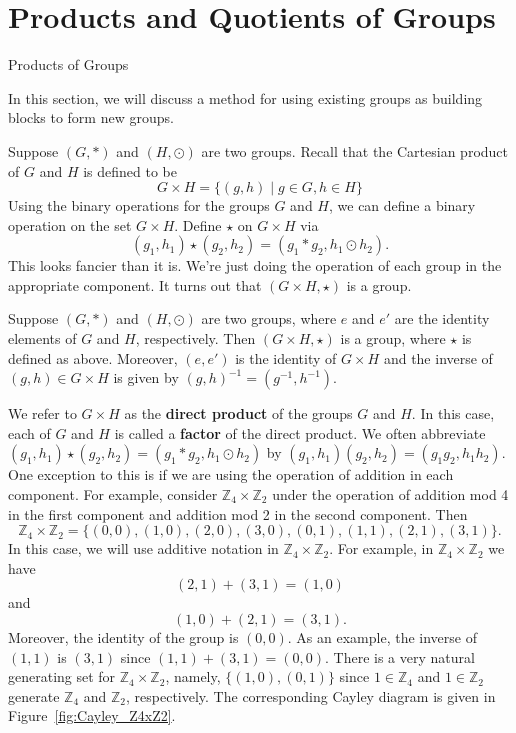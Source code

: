 \chapter{Products and Quotients of Groups}
\label{chapter:products_quotients}

\begin{section}{Products of Groups}

In this section, we will discuss a method for using existing groups as building blocks to form new groups.

Suppose $(G,*)$ and $(H,\odot)$ are two groups.  Recall that the Cartesian product of $G$ and $H$ is defined to be
\[
G\times H=\{(g,h)\mid g\in G,h\in H\}
\]
Using the binary operations for the groups $G$ and $H$, we can define a binary operation on the set $G\times H$.  Define $\star$ on $G\times H$ via
\[
(g_1,h_1)\star(g_2,h_2)=(g_1*g_2,h_1\odot h_2).
\]
This looks fancier than it is.  We're just doing the operation of each group in the appropriate component.  It turns out that $(G\times H,\star)$ is a group.

\begin{theorem}
Suppose $(G,*)$ and $(H,\odot)$ are two groups, where $e$ and $e'$ are the identity elements of $G$ and $H$, respectively.   Then $(G\times H,\star)$ is a group, where $\star$ is defined as above.  Moreover, $(e,e')$ is the identity of $G\times H$ and the inverse of $(g,h)\in G\times H$ is given by $(g,h)^{-1}=(g^{-1},h^{-1})$.
\end{theorem}

We refer to $G\times H$ as the \textbf{direct product} of the groups $G$ and $H$.  In this case, each of $G$ and $H$ is called a \textbf{factor} of the direct product.  We often abbreviate $(g_1,h_1)\star(g_2,h_2)=(g_1*g_2,h_1\odot h_2)$ by $(g_1,h_1)(g_2,h_2)=(g_1 g_2,h_1 h_2)$. One exception to this is if we are using the operation of addition in each component.  For example, consider $\mathbb{Z}_4\times \mathbb{Z}_2$ under the operation of addition mod 4 in the first component and addition mod 2 in the second component.  Then
\[
\mathbb{Z}_4 \times \mathbb{Z}_2=\{(0,0),(1,0),(2,0),(3,0),(0,1),(1,1),(2,1),(3,1)\}.
\]
In this case, we will use additive notation in $\mathbb{Z}_4\times \mathbb{Z}_2$.  For example, in $\mathbb{Z}_4 \times \mathbb{Z}_2$ we have
\[
(2,1)+(3,1)=(1,0)
\]
and
\[
(1,0)+(2,1)=(3,1).
\]
Moreover, the identity of the group is $(0,0)$.  As an example, the inverse of $(1,1)$ is $(3,1)$ since $(1,1)+(3,1)=(0,0)$.  There is a very natural generating set for $\mathbb{Z}_4\times \mathbb{Z}_2$, namely, $\{(1,0),(0,1)\}$ since $1\in \mathbb{Z}_4$ and $1\in \mathbb{Z}_2$ generate $\mathbb{Z}_4$ and $\mathbb{Z}_2$, respectively.  The corresponding Cayley diagram is given in Figure~\ref{fig:Cayley_Z4xZ2}.


\end{section}
